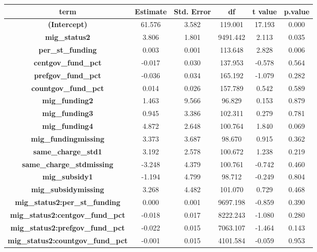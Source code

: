 \documentclass[
  man,
  floatsintext,
  longtable,
  nolmodern,
  notxfonts,
  notimes,
  colorlinks=true,linkcolor=blue,citecolor=blue,urlcolor=blue]{apa7}
\begin{document}
\begin{table}

{\caption{{The effect of education funding on average Chinese exam
scores differences within
schools}{\label{tbl-chinese-achivement-comparison}}}
\vspace{-20pt}}

\begingroup\fontsize{10}{12}\selectfont

\begin{longtable*}[t]{>{}cccccc}
\toprule
term & Estimate & Std. Error & df & t value & p.value\\
\midrule
\textbf{(Intercept)} & 61.576 & 3.582 & 119.001 & 17.193 & 0.000\\
\textbf{mig\_status2} & 3.806 & 1.801 & 9491.442 & 2.113 & 0.035\\
\textbf{per\_st\_funding} & 0.003 & 0.001 & 113.648 & 2.828 & 0.006\\
\textbf{centgov\_fund\_pct} & -0.017 & 0.030 & 137.953 & -0.578 & 0.564\\
\textbf{prefgov\_fund\_pct} & -0.036 & 0.034 & 165.192 & -1.079 & 0.282\\
\addlinespace
\textbf{countgov\_fund\_pct} & 0.014 & 0.026 & 157.789 & 0.542 & 0.589\\
\textbf{mig\_funding2} & 1.463 & 9.566 & 96.829 & 0.153 & 0.879\\
\textbf{mig\_funding3} & 0.945 & 3.386 & 102.311 & 0.279 & 0.781\\
\textbf{mig\_funding4} & 4.872 & 2.648 & 100.764 & 1.840 & 0.069\\
\textbf{mig\_fundingmissing} & 3.373 & 3.687 & 98.670 & 0.915 & 0.362\\
\addlinespace
\textbf{same\_charge\_std1} & 3.192 & 2.578 & 100.672 & 1.238 & 0.219\\
\textbf{same\_charge\_stdmissing} & -3.248 & 4.379 & 100.761 & -0.742 & 0.460\\
\textbf{mig\_subsidy1} & -1.194 & 4.799 & 98.712 & -0.249 & 0.804\\
\textbf{mig\_subsidymissing} & 3.268 & 4.482 & 101.070 & 0.729 & 0.468\\
\textbf{mig\_status2:per\_st\_funding} & 0.000 & 0.001 & 9697.198 & -0.859 & 0.390\\
\addlinespace
\textbf{mig\_status2:centgov\_fund\_pct} & -0.018 & 0.017 & 8222.243 & -1.080 & 0.280\\
\textbf{mig\_status2:prefgov\_fund\_pct} & -0.022 & 0.015 & 7063.107 & -1.464 & 0.143\\
\textbf{mig\_status2:countgov\_fund\_pct} & -0.001 & 0.015 & 4101.584 & -0.059 & 0.953\\

\end{longtable*}
\end{table}
\end{document}
